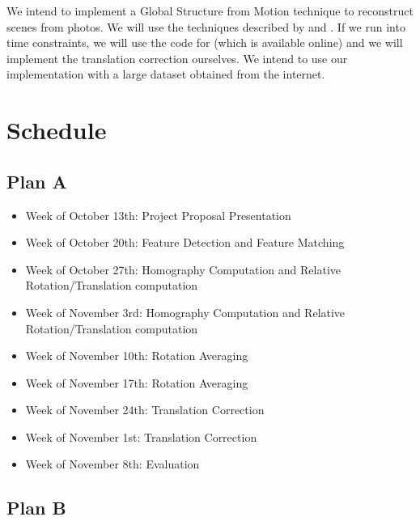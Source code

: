 \documentclass[conference, 12pt]{acmsiggraph}
\begin{document}
We intend to implement a Global Structure from Motion technique to reconstruct scenes from photos. We will use the techniques described by \cite{rotation} and \cite{translation}. If we run into time constraints, we will use the code for \cite{rotation} (which is available online) and we will implement the translation correction ourselves. We intend to use our implementation with a large dataset obtained from the internet.

\section{Schedule}

\subsection{Plan A}

\begin{itemize}
	\item {Week of October 13th}: Project Proposal Presentation
	\item {Week of October 20th}: Feature Detection and Feature Matching
	\item {Week of October 27th}: Homography Computation and Relative Rotation/Translation computation
	\item {Week of November 3rd}: Homography Computation and Relative Rotation/Translation computation
	\item {Week of November 10th}: Rotation Averaging
	\item {Week of November 17th}: Rotation Averaging
	\item {Week of November 24th}: Translation Correction
	\item {Week of November 1st}: Translation Correction
	\item {Week of November 8th}: Evaluation
\end{itemize}

\subsection{Plan B}
\end{document}
